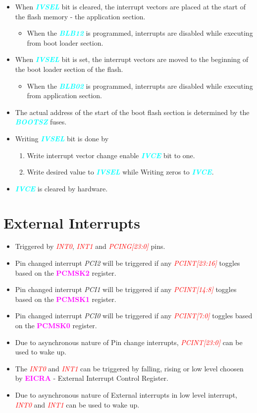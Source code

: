 \documentclass{article}
\newcommand{\bitFormat}[1]{\emph{\textbf{\textcolor{cyan}{#1}}}}
\newcommand{\regFormat}[1]{\textbf{\textcolor{magenta}{#1}}}
\newcommand{\pinFormat}[1]{\emph{\textcolor{red}{#1}}}
\begin{document}
\begin{itemize}
    \item When \bitFormat{IVSEL} bit is cleared, the interrupt vectors are placed at the start of the flash memory - the application section.
        \begin{itemize}
            \item When the \bitFormat{BLB12} is programmed, interrupts are disabled while executing from boot loader section.
        \end{itemize}
    \item When \bitFormat{IVSEL} bit is set, the interrupt vectors are moved to the beginning of the boot loader section of the flash. 
        \begin{itemize}
            \item When the \bitFormat{BLB02} is programmed, interrupts are disabled while executing from application section.
        \end{itemize}
    \item The actual address of the start of the boot flash section is determined by the \bitFormat{BOOTSZ} fuses.
    \item Writing \bitFormat{IVSEL} bit is done by
    \begin{enumerate}[label=(\alph*)]
        \item Write interrupt vector change enable \bitFormat{IVCE} bit to one.
        \item Write desired value to \bitFormat{IVSEL} while Writing zeros to \bitFormat{IVCE}.
    \end{enumerate}
    \item \bitFormat{IVCE} is cleared by hardware.
\end{itemize}

\section{External Interrupts}
\begin{itemize}
    \item Triggered by \pinFormat{INT0}, \pinFormat{INT1} and \pinFormat{PCING[23:0]} pins.
    \item Pin changed interrupt \emph{PCI2} will be triggered if any \pinFormat{PCINT[23:16]} toggles based on the \regFormat{PCMSK2} register.
    \item Pin changed interrupt \emph{PCI1} will be triggered if any \pinFormat{PCINT[14:8]} toggles based on the \regFormat{PCMSK1} register.
    \item Pin changed interrupt \emph{PCI0} will be triggered if any \pinFormat{PCINT[7:0]} toggles based on the \regFormat{PCMSK0} register.
    \item Due to asynchronous nature of Pin change interrupts, \pinFormat{PCINT[23:0]} can be used to wake up.
    \item The \pinFormat{INT0} and \pinFormat{INT1} can be triggered by falling, rising or low level choosen by \regFormat{EICRA} - External Interrupt Control Register.
    \item Due to asynchronous nature of External interrupts in low level interrupt, \pinFormat{INT0} and \pinFormat{INT1}  can be used to wake up.
 \end{itemize}
\end{document}
